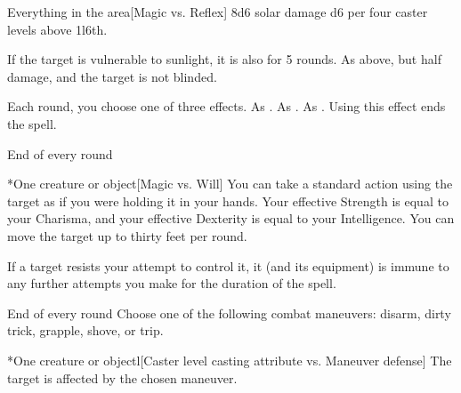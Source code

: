 \begin{spelltarget}{Everything in the area}[Magic vs. Reflex]
    \spellsuccess 8d6 solar damage \add d6 per four caster levels above 1l6th.

    If the target is vulnerable to sunlight, it is also \blinded for 5 rounds.
    \spellfailure As above, but half damage, and the target is not blinded.
\end{spelltarget}

\begin{comment}
\subsubsection{T}
\end{comment}

\spellrng{\rngmed}
\spellline
\spellspecial Each round, you choose one of three effects.
 As .
 As .
 As . Using this effect ends the spell.

\spellrng{\rngmed}
\begin{spelltrigger}{End of every round}
    \begin{spelltarget}*{One creature or object}[Magic vs. Will]
        \spellsuccess You can take a standard action using the target as if you were holding it in your hands. Your effective Strength is equal to your Charisma, and your effective Dexterity is equal to your Intelligence. You can move the target up to thirty feet per round.
    \end{spelltarget}
\end{spelltrigger}
\spellnotes If a target resists your attempt to control it, it (and its equipment) is immune to any further attempts you make for the duration of the spell.

\spellrng{\rngmed}
\spellline
\begin{spelltrigger}{End of every round}
    \spellspecial Choose one of the following combat maneuvers: disarm, dirty trick, grapple, shove, or trip.
    \begin{spelltarget}*{One creature or object}l[Caster level \add casting attribute vs. Maneuver defense]
        \spellsuccess The target is affected by the chosen maneuver.
    \end{spelltarget}
\end{spelltrigger}

